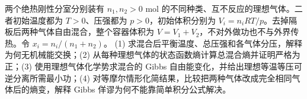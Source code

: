 两个绝热刚性分室分别装有 \(n_1,n_2>0\) mol 的不同种类、互不反应的理想气体。二者初始温度都为 \(T>0\)、压强都为 \(p>0\)，初始体积分别为 \(V_i=n_iRT/p\)。去掉隔板后两种气体自由混合，整个容器体积为 \(V=V_1+V_2\)，不对外做功也不与外界传热。令 \(x_i=n_i/(n_1+n_2)\)。
(1) 求混合后平衡温度、总压强和各气体分压，解释为何无机械能交换；(2) 从每种理想气体的状态函数熵计算总混合熵并证明严格为正；(3) 使用理想气体化学势求混合的 Gibbs 自由能变化，并给出理想等温等压可逆分离所需最小功；(4) 对等摩尔情形化简结果，比较把两种气体改成完全相同气体后的熵变，解释 Gibbs 佯谬为何不能靠简单积分公式解决。
